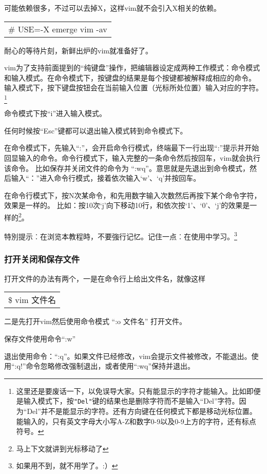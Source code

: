 \documentclass[amstex,twoside]{ctexbook}
\newenvironment{code}{\small\tt\begin{longtable}{p{0.8\textwidth}}}{\end{longtable}}
\begin{document}
可能依赖很多，不过可以去掉{}X{}，这样vim就不会引入X相关的依赖。

\begin{code}
\# USE=-X emerge vim -av
\end{code}

耐心的等待片刻，新鲜出炉的vim就准备好了。

vim为了支持前面提到的“纯键盘”操作，把编辑器设定成两种工作模式：命令模式和输入模式。在命令模式下，按键盘的结果是每个按键都被解释成相应的命令。
输入模式下，按下键盘按钮会在当前输入位置（光标所处位置）输入对应的字符。\footnote{这里还是要废话一下，以免误导大家。只有能显示的字符才能输入。比如即便是输入模式下，按{\tt "Del"}键的结果也是删除字符而不是输入“Del”字符。因为“Del”并不是能显示的字符。还有方向键在任何模式下都是移动光标位置。能输入的，只有英文字母大小写A-Z和数字0-9以及0-9上方的字符，还有标点符号。}

命令模式下按“i”进入输入模式。

任何时候按“Esc”键都可以退出输入模式转到命令模式下。

在命令模式下，先输入“:”，会开启命令行模式，终端最下一行出现“:”提示并开始回显输入的命令。命令行模式下，输入完整的一条命令然后按回车，vim就会执行该命令。
比如保存并关闭文件的命令为 “:wq”。意思就是先退出到命令模式，然后输入“：”进入命令行模式，接着依次输入‘w’、‘q’并按回车。

在命令行模式下，按N次某命令，和先用数字输入次数然后再按下某个命令字符，效果是一样的。
比如：按10次‘j’向下移动10行，和依次按‘1’、‘0’、‘j’的效果是一样的\footnote{马上下文就讲到光标移动了}。

特別提示︰在浏览本教程時，不要強行记忆。记住一点︰在使用中学习。\footnote{如果用不到，就不用学了。:）}

\subsubsection{打开关闭和保存文件}


打开文件的办法有两个，一是在命令行上给出文件名，就像这样

\begin{code}
\$ vim 文件名
\end{code}

二是先打开vim然后使用命令模式 “:o 文件名” 打开文件。

保存文件使用命令“:w”

退出使用命令：“:q”。如果文件已经修改，vim会提示文件被修改，不能退出。使用“:q!”命令忽略修改强制退出，或者使用“:wq”保持并退出。
\end{document}
